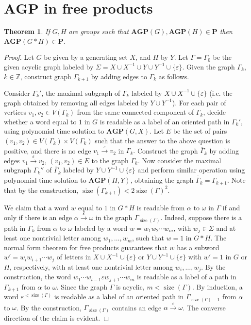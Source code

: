 \documentclass[10pt]{amsart}
\newtheorem{theorem}{Theorem}[section]
\theoremstyle{definition}
\DeclareMathOperator{\size}{{size}}
\def\P{{\mathbf{P}}}
\def\AGP{{\mathbf{AGP}}}
\begin{document}
\section{$\AGP$ in free products}\label{sec:free_prod}
\begin{theorem}\label{th:ptime_agp}
If $G,H$ are groups such that $\AGP(G),\AGP(H)\in\P$ then $\AGP(G*H)\in\P$.
\end{theorem}
\begin{proof}
Let $G$ be given by a generating set $X$, and $H$ by $Y$. Let $\Gamma=\Gamma_0$ be the given acyclic graph labeled by $\Sigma=X\cup X^{-1}\cup Y\cup Y^{-1}\cup\{\varepsilon\}$. Given the graph $\Gamma_k$, $k\in\mathbb Z$, construct graph $\Gamma_{k+1}$ by adding edges to $\Gamma_k$ as follows.

Consider $\Gamma_{k}'$, the maximal subgraph of $\Gamma_k$ labeled by  $X\cup X^{-1}\cup \{\varepsilon\}$ (i.e. the graph obtained by removing all edges labeled by $Y\cup Y^{-1}$).
For each pair of vertices $v_1,v_2\in V(\Gamma_k)$ from the same connected component of $\Gamma_k$, decide whether a word equal to $1$ in $G$ is readable as a label of an oriented path in $\Gamma_k'$, using polynomial time solution to $\AGP(G,X)$.
Let $E$ be the set of pairs $(v_1,v_2)\in V(\Gamma_k)\times V(\Gamma_k)$ such that the answer to the above question is positive, and there is no edge $v_1\overset{\varepsilon}{\to}v_2$ in $\Gamma_k.$ Construct the graph $\overline{\Gamma}_k$ by adding edges  $v_1\overset{\varepsilon}{\to}v_2$, $(v_1,v_2)\in E$ to the graph $\Gamma_k$.
Now consider the maximal subgraph $\Gamma_k''$ of $\overline{\Gamma}_k$ labeled by $Y\cup Y^{-1}\cup \{\varepsilon\}$ and perform similar operation using polynomial time solution to $\AGP(H,Y)$, obtaining the graph $\overline{\overline{\Gamma}}_k=\Gamma_{k+1}$.
Note that by the construction, $\size(\Gamma_{k+1})<2\size(\Gamma)^2$.

We claim that a word $w$ equal to $1$ in $G*H$ is readable from $\alpha$ to $\omega$ in $\Gamma$ if and only if there is an edge $\alpha\overset{\varepsilon}{\to}\omega$ in the graph $\Gamma_{\size(\Gamma)}$.
Indeed, suppose there is a path in $\Gamma_k$ from $\alpha$ to $\omega$ labeled by a word $w=w_1w_2\cdots w_m$, with $w_j\in \Sigma$ and at least one nontrivial letter among $w_1,\ldots, w_m$, such that $w=1$ in $G*H$.
The normal form theorem for free products guarantees that $w$ has a subword $w'=w_iw_{i+1}\cdots w_j$ of letters in $X\cup X^{-1}\cup \{\varepsilon\}$ or $Y\cup Y^{-1}\cup \{\varepsilon\}$ with $w'=1$ in $G$ or $H$, respectively, with at least one nontrivial letter among $w_i,\ldots,w_j$.
By the construction, the word $w_1\cdots w_{i-1}\varepsilon w_{j+1}\cdots w_m$ is readable as a label of a path in $\Gamma_{k+1}$ from $\alpha$ to $\omega$. Since the graph $\Gamma$ is acyclic, $m< \size(\Gamma)$.
By induction, a word $\varepsilon^{<\size(\Gamma)}$ is readable as a label of an oriented path in $\Gamma_{\size(\Gamma)-1}$ from $\alpha$ to $\omega$.
By the construction, $\Gamma_{\size(\Gamma)}$ contains an edge $\alpha\overset{\varepsilon}{\to}\omega$.
The converse direction of the claim is evident.
\end{proof}
\end{document}
